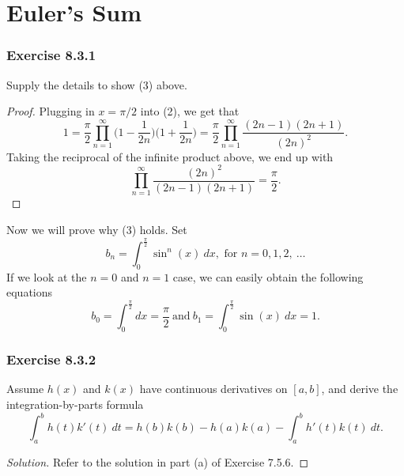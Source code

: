 \section{Euler's Sum}


\subsubsection{Exercise 8.3.1} Supply the details to show (3) above.

\begin{proof}
Plugging in \( x = \pi / 2  \) into (2), we get that 
\[  1 = \frac{ \pi }{ 2 }  \prod_{n=1}^{\infty } \Big( 1 - \frac{ 1 }{ 2n }  \Big)\Big( 1 + \frac{ 1 }{ 2n }  \Big) =  \frac{ \pi }{ 2 }  \prod_{n=1}^{\infty } \frac{ (2n-1)(2n+1) }{ (2n)^{2} }.  \]
Taking the reciprocal of the infinite product above, we end up with
\[  \prod_{n=1}^{\infty } \frac{ (2n)^{2} }{  (2n-1) (2n+1) } = \frac{ \pi }{ 2 }.  \]
\end{proof}

Now we will prove why (3) holds. Set 
\[  b_{n} = \int_{ 0 }^{ \frac{ \pi }{ 2 }  } \sin^{n}(x)  \ dx , \text{ for } n = 0,1,2, \ \dots \] If we look at the \( n=0  \) and \( n = 1  \) case, we can easily obtain the following equations 
\[  b_{0 } = \int_{ 0 }^{ \frac{ \pi }{ 2 }  }  dx = \frac{ \pi }{ 2 } \ \text{and} \ b_{1} = \int_{ 0 }^{ \frac{ \pi }{ 2 }  } \sin(x)  \ dx = 1. \]
\subsubsection{Exercise 8.3.2} Assume \( h(x)  \) and \( k(x)  \) have continuous derivatives on \( [a,b]  \), and derive the integration-by-parts formula
\[  \int_{ a }^{ b } h(t) k'(t) \  dt = h(b)k(b) - h(a)k(a) - \int_{ a }^{ b } h'(t) k(t)  \  dt. \]
\begin{proof}[Solution]
Refer to the solution in part (a) of Exercise 7.5.6.
\end{proof}

